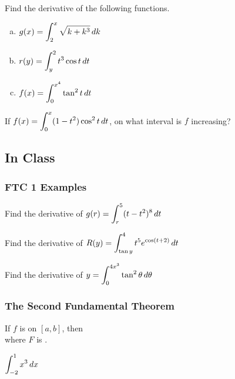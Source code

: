 \documentclass[notes]{subfiles}
\begin{document}
		\begin{ex}
			Find the derivative of the following functions.
			\begin{enumerate}[(a)]
				\item \(g(x) = \displaystyle \int_2^x \sqrt{k + k^3}\, dk\)
					
				\item \(r(y) = \displaystyle \int_y^2 t^3\cos t\, dt\)
					
				\item \(f(x) = \displaystyle \int_0^{x^4} \tan^2t\, dt\)
			\end{enumerate}
		\end{ex}
		
		\begin{ex}
			If \(f(x) = \displaystyle \int_0^x (1-t^2)\cos^2 t\, dt\), on what interval is \(f\) increasing?
		\end{ex}
			\vs{1}
			\newpage
			
	\subsection*{In Class}
	\subsubsection*{FTC 1 Examples}
		\begin{ex}
			Find the derivative of \(g(r) = \displaystyle \int_r^5 (t-t^2)^8\,dt\)
		\end{ex}
			
		\begin{ex}
			Find the derivative of \(R(y) = \displaystyle \int_{\tan y}^4 t^5e^{\cos (t+2)}\, dt\)
		\end{ex}
			\vs{1}
			
		\begin{ex}
			Find the derivative of \(y = \displaystyle\int_0^{4x^3} \tan^2\theta\, d\theta\)
		\end{ex}
			\vs{1}
			\newpage
			
	\subsubsection*{The Second Fundamental Theorem}
		\begin{thm}
				If \(f\) is  on \([a,b]\), then\vspace{.75in}\\ where \(F\) is \blank{3}.
		\end{thm}
		\begin{ex}
			\(\displaystyle \int_{-2}^1 x^3\,dx\)
		\end{ex}
			
\end{document}
